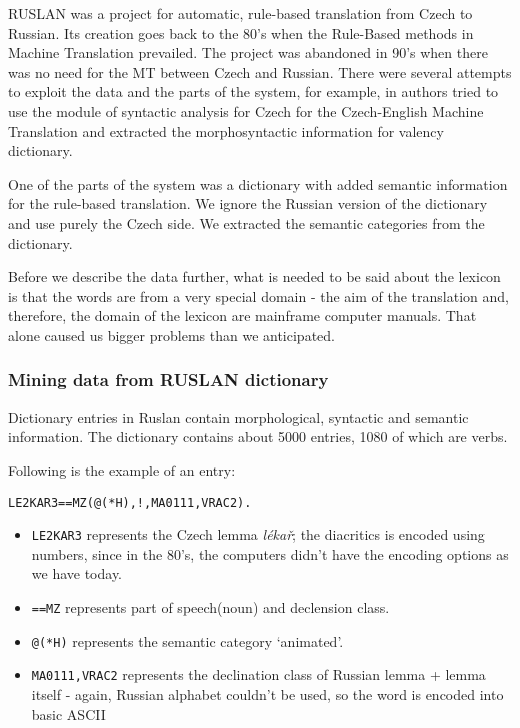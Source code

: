 \documentclass[letterpaper]{article}
\begin{document}
RUSLAN was a project for automatic, rule-based translation from Czech to Russian. Its creation \cite{oliva1989parser} goes back to the 80's when the Rule-Based methods in Machine Translation prevailed.  The project was abandoned in 90's when
there was no need for the MT between Czech and Russian. There were
several attempts to exploit the data and the parts of the system, for
example, in \cite{mt-recycled} authors tried to use the module
of syntactic analysis for Czech for the Czech-English Machine Translation
and \cite{pisa2012} extracted the morphosyntactic information for
valency dictionary.

One of the parts of the system  was a dictionary with added semantic information for the rule-based translation. We ignore the Russian version of the dictionary and use purely the Czech side. We extracted the semantic categories from the dictionary. 

Before we describe the data further, what is needed to be said about the lexicon is that the words are from a very special domain - the aim of the translation and, therefore, the domain of the lexicon are mainframe computer manuals. That alone caused us bigger problems than we anticipated.

\subsubsection{Mining data from RUSLAN dictionary}

Dictionary entries in Ruslan contain morphological,
syntactic and semantic information. The dictionary contains about 5000 entries, 1080 of which are verbs.

Following is the example of an entry:

\begin{verbatim}
LE2KAR3==MZ(@(*H),!,MA0111,VRAC2).
\end{verbatim}

\begin{itemize}
\item \texttt{LE2KAR3} represents the Czech lemma \emph{lékař}; the diacritics is encoded using numbers, since in the 80's, the computers didn't have the encoding options as we have today.
\item \texttt{==MZ} represents part of speech(noun) and declension class.
\item \texttt{@(*H)} represents the semantic category `animated'.
\item \texttt{MA0111,VRAC2} represents the declination class of Russian lemma + lemma itself - again, Russian alphabet couldn't be used, so the word is encoded into basic ASCII
\end{itemize}
\end{document}
